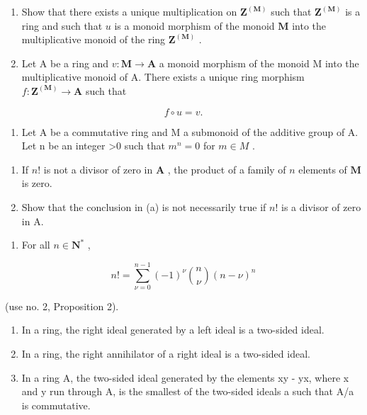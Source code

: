 \begin{enumerate}
\def\labelenumi{(\alph{enumi})}
\item
  Show that there exists a unique multiplication on \(\mathbf{Z}^{(\mathbf{M})}\) such that \(\mathbf{Z}^{(\mathbf{M})}\) is a ring and such that \(u\) is a monoid morphism of the monoid \(\mathbf{M}\) into the multiplicative monoid of the ring \(\mathbf{Z}^{(\mathbf{M})}\) .
\item
  Let A be a ring and \(v: \mathbf{M} \to \mathbf{A}\) a monoid morphism of the monoid M into the multiplicative monoid of A. There exists a unique ring morphism \(f: \mathbf{Z}^{(\mathbf{M})} \to \mathbf{A}\) such that
\end{enumerate}

\[
f \circ u = v.
\]

\begin{enumerate}
\def\labelenumi{\arabic{enumi}.}
\setcounter{enumi}{5}
\tightlist
\item
  Let A be a commutative ring and M a submonoid of the additive group of A. Let n be an integer \textgreater0 such that \(m^{n} = 0\) for \(m \in M\) .
\end{enumerate}

\begin{enumerate}
\def\labelenumi{(\alph{enumi})}
\item
  If \(n!\) is not a divisor of zero in \(\mathbf{A}\) , the product of a family of \(n\) elements of \(\mathbf{M}\) is zero.
\item
  Show that the conclusion in (a) is not necessarily true if \(n!\) is a divisor of zero in A.
\end{enumerate}

\begin{enumerate}
\def\labelenumi{\arabic{enumi}.}
\setcounter{enumi}{6}
\tightlist
\item
  For all \(n \in \mathbf{N}^*\) ,
\end{enumerate}

\[
n! = \sum_ {\nu = 0} ^ {n - 1} (- 1) ^ {\nu} \binom {n} {\nu} (n - \nu) ^ {n}
\]

(use no. 2, Proposition 2).

\begin{enumerate}
\def\labelenumi{\arabic{enumi}.}
\setcounter{enumi}{7}
\item
  In a ring, the right ideal generated by a left ideal is a two-sided ideal.
\item
  In a ring, the right annihilator of a right ideal is a two-sided ideal.
\item
  In a ring A, the two-sided ideal generated by the elements xy - yx, where x and y run through A, is the smallest of the two-sided ideals a such that A/a is commutative.
\end{enumerate}

